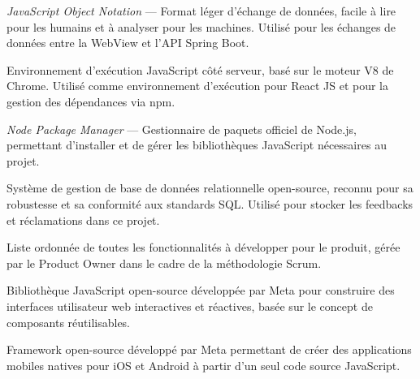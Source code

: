 \begin{description}[leftmargin=4cm, labelwidth=3.5cm]
    \vspace{0.3cm}

    \item[\textbf{JSON}] \textit{JavaScript Object Notation} — 
    Format léger d'échange de données, facile à lire pour les 
    humains et à analyser pour les machines. Utilisé pour les 
    échanges de données entre la WebView et l'API Spring Boot.

    \vspace{0.3cm}

    \item[\textbf{Node.js}] Environnement d'exécution JavaScript 
    côté serveur, basé sur le moteur V8 de Chrome. Utilisé comme 
    environnement d'exécution pour React JS et pour la gestion 
    des dépendances via npm.

    \vspace{0.3cm}

    \item[\textbf{npm}] \textit{Node Package Manager} — Gestionnaire 
    de paquets officiel de Node.js, permettant d'installer et de 
    gérer les bibliothèques JavaScript nécessaires au projet.

    \vspace{0.3cm}

    \item[\textbf{PostgreSQL}] Système de gestion de base de données 
    relationnelle open-source, reconnu pour sa robustesse et sa 
    conformité aux standards SQL. Utilisé pour stocker les feedbacks 
    et réclamations dans ce projet.

    \vspace{0.3cm}

    \item[\textbf{Product Backlog}] Liste ordonnée de toutes les 
    fonctionnalités à développer pour le produit, gérée par le 
    Product Owner dans le cadre de la méthodologie Scrum.

    \vspace{0.3cm}

    \item[\textbf{React JS}] Bibliothèque JavaScript open-source 
    développée par Meta pour construire des interfaces utilisateur 
    web interactives et réactives, basée sur le concept de composants 
    réutilisables.

    \vspace{0.3cm}

    \item[\textbf{React Native}] Framework open-source développé 
    par Meta permettant de créer des applications mobiles natives 
    pour iOS et Android à partir d'un seul code source JavaScript.


\end{description}
